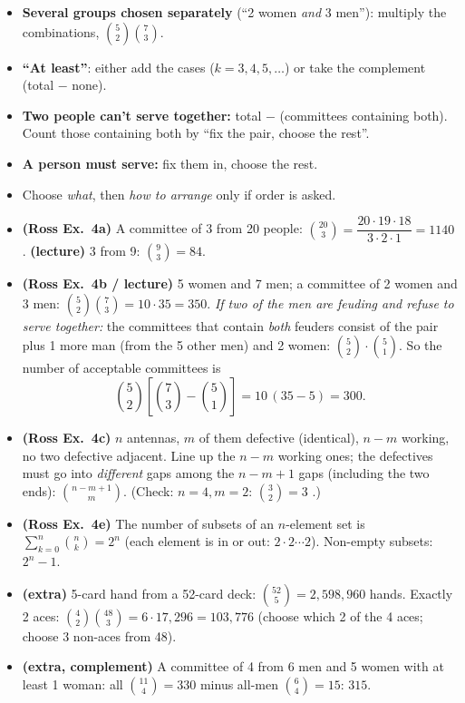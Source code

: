 \documentclass[11pt]{article}
\begin{document}
\begin{methodbox}
\begin{itemize}
\item \textbf{Several groups chosen separately} (``2 women \emph{and} 3 men''): multiply the combinations, $\binom52\binom73$.
\item \textbf{``At least''}: either add the cases ($k=3,4,5,\dots$) or take the complement (total $-$ none).
\item \textbf{Two people can't serve together:} total $-$ (committees containing both). Count those containing both by ``fix the pair, choose the rest''.
\item \textbf{A person must serve:} fix them in, choose the rest.
\item Choose \emph{what}, then \emph{how to arrange} only if order is asked.
\end{itemize}
\end{methodbox}

\begin{exbox}[Examples]
\begin{itemize}
\item \textbf{(Ross Ex.\ 4a)} A committee of 3 from 20 people: $\binom{20}3=\dfrac{20\cdot19\cdot18}{3\cdot2\cdot1}=1140$. \textbf{(lecture)} 3 from 9: $\binom93=84$.
\item \textbf{(Ross Ex.\ 4b / lecture)} 5 women and 7 men; a committee of 2 women and 3 men: $\binom52\binom73=10\cdot35=350$. \emph{If two of the men are feuding and refuse to serve together:} the committees that contain \emph{both} feuders consist of the pair plus 1 more man (from the 5 other men) and 2 women: $\binom52\cdot\binom51$. So the number of acceptable committees is
\[ \binom52\left[\binom73-\binom51\right]=10\,(35-5)=300. \]
\item \textbf{(Ross Ex.\ 4c)} $n$ antennas, $m$ of them defective (identical), $n-m$ working, no two defective adjacent. Line up the $n-m$ working ones; the defectives must go into \emph{different} gaps among the $n-m+1$ gaps (including the two ends): $\binom{n-m+1}{m}$. (Check: $n=4,m=2$: $\binom32=3$ \checkmark.)
\item \textbf{(Ross Ex.\ 4e)} The number of subsets of an $n$-element set is $\sum_{k=0}^n\binom nk=2^n$ (each element is in or out: $2\cdot2\cdots2$). Non-empty subsets: $2^n-1$.
\item \textbf{(extra)} 5-card hand from a 52-card deck: $\binom{52}5=2{,}598{,}960$ hands. Exactly 2 aces: $\binom42\binom{48}3=6\cdot17{,}296=103{,}776$ (choose which 2 of the 4 aces; choose 3 non-aces from 48).
\item \textbf{(extra, complement)} A committee of 4 from 6 men and 5 women with at least 1 woman: all $\binom{11}4=330$ minus all-men $\binom64=15$: $315$.
\end{itemize}
\end{exbox}
\end{document}
